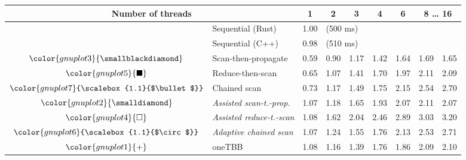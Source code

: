 \begin{tabular}{clrrrrrrr}
\toprule
\multicolumn{2}{c}{\textbf{Number of threads}} & \multicolumn{1}{c}{\textbf{ 1 }} & \multicolumn{1}{c}{\textbf{ 2 }} & \multicolumn{1}{c}{\textbf{ 3 }} & \multicolumn{1}{c}{\textbf{ 4 }} & \multicolumn{1}{c}{\textbf{ 6 }} & \multicolumn{2}{c}{\textbf{ 8 } \dots \textbf{ 16 }} \\
\midrule
& Sequential (Rust) & \multicolumn{1}{r}{ 1.00 } & \multicolumn{ 6 }{l}{(500 ms)} \\
& Sequential (C++) & \multicolumn{1}{r}{ 0.98 } & \multicolumn{ 6 }{l}{(510 ms)} \\
\rowcolor{gnuplot3!10}$\color{gnuplot3}{\smallblackdiamond}$ & Scan-then-propagate & \cellcolor{gnuplot3!10} 0.59 & \cellcolor{gnuplot3!10} 0.90 & \cellcolor{gnuplot3!10} 1.17 & \cellcolor{gnuplot3!10} 1.42 & \cellcolor{gnuplot3!10} 1.64 & \cellcolor{gnuplot3!10} 1.69 & \cellcolor{gnuplot3!10} 1.65 \\
\rowcolor{gnuplot5!10}$\color{gnuplot5}{\blacksquare}$ & Reduce-then-scan & \cellcolor{gnuplot5!10} 0.65 & \cellcolor{gnuplot5!10} 1.07 & \cellcolor{gnuplot5!10} 1.41 & \cellcolor{gnuplot5!10} 1.70 & \cellcolor{gnuplot5!10} 1.97 & \cellcolor{gnuplot5!10} 2.11 & \cellcolor{gnuplot5!10} 2.09 \\
\rowcolor{gnuplot7!10}$\color{gnuplot7}{\scalebox{1.1}{$\bullet$}}$ & Chained scan & \cellcolor{gnuplot7!10} 0.73 & \cellcolor{gnuplot7!10} 1.17 & \cellcolor{gnuplot7!10} 1.49 & \cellcolor{gnuplot7!10} 1.75 & \cellcolor{gnuplot7!10} 2.15 & \cellcolor{gnuplot7!10} 2.54 & \cellcolor{gnuplot7!10} 2.70 \\
\rowcolor{gnuplot2!30}$\color{gnuplot2}{\smalldiamond}$ & \textit{Assisted scan-t.-prop.} & \cellcolor{gnuplot2!30} 1.07 & \cellcolor{gnuplot2!30} 1.18 & \cellcolor{gnuplot2!30} 1.65 & \cellcolor{gnuplot2!30} 1.93 & \cellcolor{gnuplot2!30} 2.07 & \cellcolor{gnuplot2!30} 2.11 & \cellcolor{gnuplot2!30} 2.07 \\
\rowcolor{gnuplot4!30}$\color{gnuplot4}{\square}$ & \textit{Assisted reduce-t.-scan} & \cellcolor{gnuplot4!30} 1.08 & \cellcolor{gnuplot4!30} 1.62 & \cellcolor{gnuplot4!30} 2.04 & \cellcolor{gnuplot4!30} 2.46 & \cellcolor{gnuplot4!30} 2.89 & \cellcolor{gnuplot4!30} 3.03 & \cellcolor{gnuplot4!30} 3.20 \\
\rowcolor{gnuplot6!30}$\color{gnuplot6}{\scalebox{1.1}{$\circ$}}$ & \textit{Adaptive chained scan} & \cellcolor{gnuplot6!30} 1.07 & \cellcolor{gnuplot6!30} 1.24 & \cellcolor{gnuplot6!30} 1.55 & \cellcolor{gnuplot6!30} 1.76 & \cellcolor{gnuplot6!30} 2.13 & \cellcolor{gnuplot6!30} 2.53 & \cellcolor{gnuplot6!30} 2.71 \\
\rowcolor{gnuplot1!10}$\color{gnuplot1}{+}$ & oneTBB & \cellcolor{gnuplot1!10} 1.08 & \cellcolor{gnuplot1!10} 1.16 & \cellcolor{gnuplot1!10} 1.39 & \cellcolor{gnuplot1!10} 1.76 & \cellcolor{gnuplot1!10} 1.86 & \cellcolor{gnuplot1!10} 2.09 & \cellcolor{gnuplot1!10} 2.10 \\
\bottomrule
\end{tabular}
